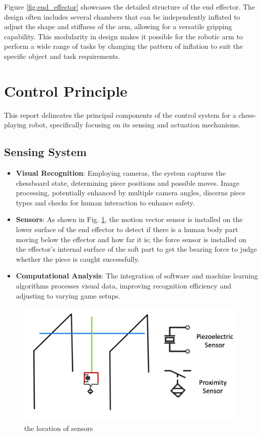 \documentclass[10pt, a4paper, twocolumn]{article}
\begin{document}
Figure \ref{fig:end_effector} showcases the detailed structure of the end effector. The design often includes several chambers that can be independently inflated to adjust the shape and stiffness of the arm, allowing for a versatile gripping capability. This modularity in design makes it possible for the robotic arm to perform a wide range of tasks by changing the pattern of inflation to suit the specific object and task requirements.

\section{Control Principle}

This report delineates the principal components of the control system for a chess-playing robot, specifically focusing on its sensing and actuation mechanisms.

\subsection{Sensing System}

\begin{itemize}
    \item \textbf{Visual Recognition}: Employing cameras, the system captures the chessboard state, determining piece positions and possible moves. Image processing, potentially enhanced by multiple camera angles, discerns piece types and checks for human interaction to enhance safety.
    \item \textbf{Sensors}: As shown in Fig. \ref{fig:sensor position}, the motion vector sensor is installed on the lower surface of the end effector to detect if there is a human body part moving below the effector and how far it is; the force sensor is installed on the effector’s internal surface of the soft part to get the bearing force to judge whether the piece is caught successfully.
    \item \textbf{Computational Analysis}: The integration of software and machine learning algorithms processes visual data, improving recognition efficiency and adjusting to varying game setups.
\end{itemize}

\begin{figure}
    \centering
    \includegraphics[width=0.8\linewidth]{sensor position.png}
    \caption{the location of sensors}
    \label{fig:sensor position}
\end{figure}
\end{document}
